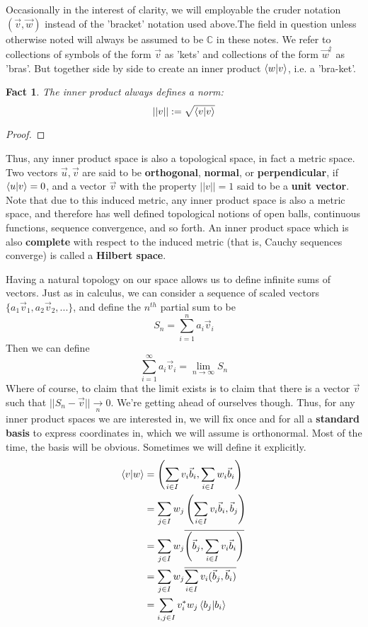 \documentclass{article}
\theoremstyle{definition}
\theoremstyle{plain}
\theoremstyle{theorem}
\newtheorem{fact}{Fact}[section]
\begin{document}
	Occasionally in the interest of clarity, we will employable the cruder notation $(\vec{v},\vec{w})$ instead of the 'bracket' notation used above.The field in question unless otherwise noted will always be assumed to be $\mathbb{C}$ in these notes. We refer to collections of symbols of the form $\vec{v}$ as 'kets' and collections of the form $\vec{w}^{\dagger}$ as 'bras'. But together side by side to create an inner product $\braket{w|v}$, i.e. a 'bra-ket'. 
	\begin{fact}
		The inner product always defines a norm:
	\[ ||v|| := \sqrt{\braket{v|v}} \]
	\end{fact}
	\begin{proof}
	\end{proof}	
	Thus, any inner product space is also a topological space, in fact a metric space. Two vectors $\vec{u},\vec{v}$ are said to be \textbf{orthogonal}, \textbf{normal}, or \textbf{perpendicular}, if $\braket{u|v} = 0$, and a vector $\vec{v}$ with the property $||v||=1$ said to be a \textbf{unit vector}. Note that due to this induced metric, any inner product space is also a metric space, and therefore has well defined topological notions of open balls, continuous functions, sequence convergence, and so forth. An inner product space which is also \textbf{complete} with respect to the induced metric (that is, Cauchy sequences converge) is called a \textbf{Hilbert space}. 
	\par Having a natural topology on our space allows us to define infinite sums of vectors. Just as in calculus, we can consider a sequence of scaled vectors $\{a_1\vec{v}_1,a_2\vec{v}_2,...\}$, and define the $n^{th}$ partial sum to be
	\[S_n = \sum_{i=1}^n a_i\vec{v}_i \]
Then we can define
	\[\sum_{i=1}^{\infty} a_i\vec{v}_i = \lim_{n\to \infty} S_n \]
Where of course, to claim that the limit exists is to claim that there is a vector $\vec{v}$ such that $||S_n - \vec{v}|| \underset{n}{\to} 0$. We're getting ahead of ourselves though. 
Thus, for any inner product spaces we are interested in, we will fix once and for all a \textbf{standard basis} to express coordinates in, which we will assume is orthonormal. Most of the time, the basis will be obvious. Sometimes we will define it explicitly.
	\begin{align}
		\braket{v|w} &= \left(\sum_{i \in I} v_i\vec{b}_i,\sum_{i \in I} w_i\vec{b}_i \right) \\
		&= \sum_{j \in I} w_j \left(\sum_{i \in I} v_i\vec{b}_i,\vec{b}_j \right) \\
		&= \sum_{j \in I} w_j \overline{\left( \vec{b}_j, \sum_{i \in I} v_i\vec{b}_i \right)} \\
		&= \sum_{j \in I} w_j \overline{ \sum_{i \in I}v_i ( \vec{b}_j, \vec{b}_i )} \\
		&= \sum_{i,j \in I} v_i^*w_j \braket{b_j|b_i}
	\end{align}
\end{document}
